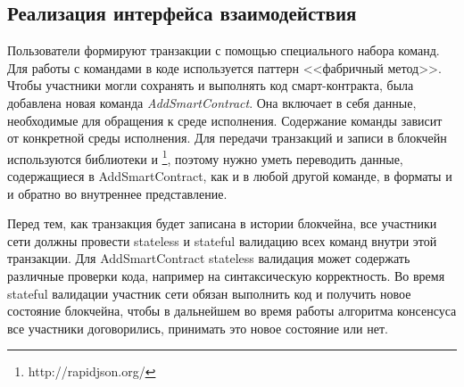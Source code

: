 \subsection{Реализация интерфейса взаимодействия}
\label{AddSmartContract}
Пользователи формируют транзакции с помощью специального набора команд.
Для работы с командами в коде используется паттерн <<фабричный метод>>.
Чтобы участники могли сохранять и выполнять код смарт-контракта, была добавлена новая команда \emph{Add\-Smart\-Con\-tract}.
Она включает в себя данные, необходимые для обращения к среде исполнения.
Содержание команды зависит от конкретной среды исполнения.
Для передачи транзакций и записи в блокчейн используются библиотеки  и \footnote{http://rapidjson.org/}, поэтому нужно уметь переводить данные, содержащиеся в AddSmartContract, как и в любой другой команде, в форматы  и  и обратно во внутреннее представление.

Перед тем, как транзакция будет записана в истории блокчейна, все участники сети должны провести stateless и stateful валидацию всех команд внутри этой транзакции.
Для Add\-Smart\-Con\-tract stateless валидация может содержать различные проверки кода, например на синтаксическую корректность.
Во время stateful валидации участник сети обязан выполнить код и получить новое состояние блокчейна, чтобы в дальнейшем во время работы алгоритма консенсуса все участники договорились, принимать это новое состояние или нет.

\vspace{0.7cm}

